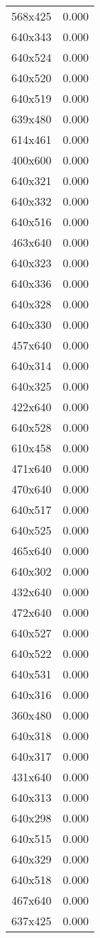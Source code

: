 \begin{table}
\begin{tabular}{lr}
568x425 & 0.000 \\
640x343 & 0.000 \\
640x524 & 0.000 \\
640x520 & 0.000 \\
640x519 & 0.000 \\
639x480 & 0.000 \\
614x461 & 0.000 \\
400x600 & 0.000 \\
640x321 & 0.000 \\
640x332 & 0.000 \\
640x516 & 0.000 \\
463x640 & 0.000 \\
640x323 & 0.000 \\
640x336 & 0.000 \\
640x328 & 0.000 \\
640x330 & 0.000 \\
457x640 & 0.000 \\
640x314 & 0.000 \\
640x325 & 0.000 \\
422x640 & 0.000 \\
640x528 & 0.000 \\
610x458 & 0.000 \\
471x640 & 0.000 \\
470x640 & 0.000 \\
640x517 & 0.000 \\
640x525 & 0.000 \\
465x640 & 0.000 \\
640x302 & 0.000 \\
432x640 & 0.000 \\
472x640 & 0.000 \\
640x527 & 0.000 \\
640x522 & 0.000 \\
640x531 & 0.000 \\
640x316 & 0.000 \\
360x480 & 0.000 \\
640x318 & 0.000 \\
640x317 & 0.000 \\
431x640 & 0.000 \\
640x313 & 0.000 \\
640x298 & 0.000 \\
640x515 & 0.000 \\
640x329 & 0.000 \\
640x518 & 0.000 \\
467x640 & 0.000 \\
637x425 & 0.000 \\

\end{tabular}
\end{table}
